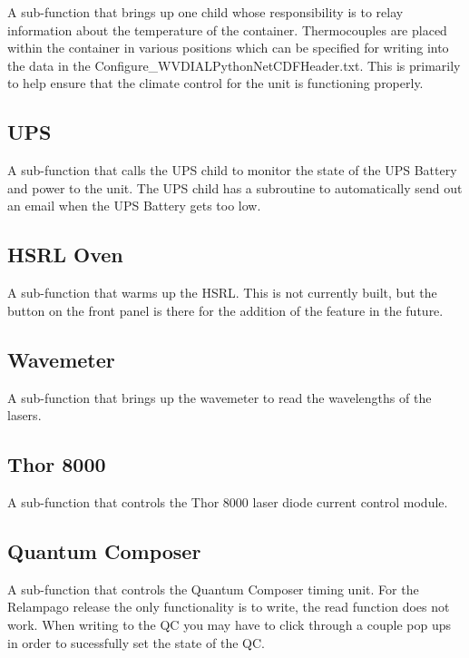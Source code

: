 A sub-function that brings up one child whose responsibility is to relay information about the temperature of the container. Thermocouples are placed within the container in various positions which can be specified for writing into the data in the Configure\_WVDIALPythonNetCDFHeader.txt. This is primarily to help ensure that the climate control for the unit is functioning properly. 

\subsection{UPS}\label{Sec:UPSSubFunction}

A sub-function that calls the UPS child to monitor the state of the UPS Battery and power to the unit. The UPS child has a subroutine to automatically send out an email when the UPS Battery gets too low. 

\subsection{HSRL Oven}\label{Sec:HSRLOvenSubFunction}

A sub-function that warms up the HSRL. This is not currently built, but the button on the front panel is there for the addition of the feature in the future. 

\subsection{Wavemeter}\label{Sec:WavemeterSubFunction}

A sub-function that brings up the wavemeter to read the wavelengths of the lasers. 

\subsection{Thor 8000}\label{Sec:T8000SubFunction}

A sub-function that controls the Thor 8000 laser diode current control module. 

\subsection{Quantum Composer}\label{Sec:QCSubFunction}

A sub-function that controls the Quantum Composer timing unit. For the Relampago release the only functionality is to write, the read function does not work. When writing to the QC you may have to click through a couple pop ups in order to sucessfully set the state of the QC. 

